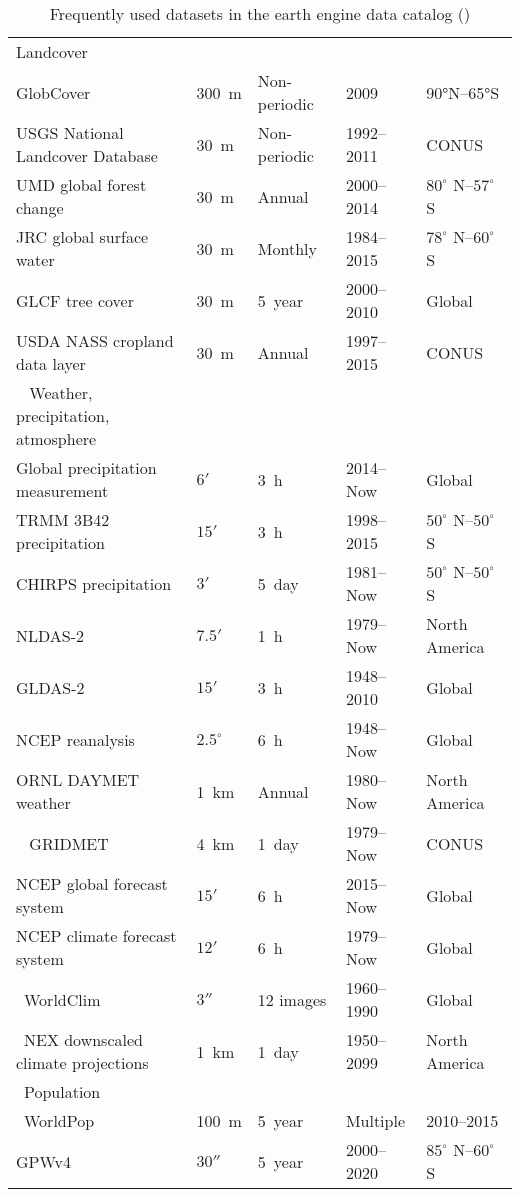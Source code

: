 \begin{table}[h]
\begin{tabularx}{\textwidth}{lXXXX}
		 Landcover		& & & & \\			
		 GlobCover	&300 m	&Non-periodic	&2009&	90°N–65°S\\
		 USGS National Landcover Database&	30 m	&Non-periodic	&1992–2011&	CONUS\\
		 UMD global forest change&	30 m&	Annual	&2000–2014&	$80^\circ$ N–$57^\circ$ S\\
		 JRC global surface water&	30 m&	Monthly	&1984–2015	&$78^\circ$ N–$60^\circ$ S\\
		 GLCF tree cover&	30 m	&5 year	&2000–2010	&Global\\
		 USDA NASS cropland data layer&	30 m&	Annual&	1997–2015&	CONUS\\
		  
		 Weather, precipitation, atmosphere	& & & & \\				
		 Global precipitation measurement& 	$6'$& 	3 h	& 2014–Now& 	Global\\
		 TRMM 3B42 precipitation& 	$15'$& 	3 h	& 1998–2015	& $50^\circ$ N–$50^\circ$ S\\
		 CHIRPS precipitation& 	$3'$& 	5 day& 	1981–Now& 	$50^\circ$ N–$50^\circ$ S\\
		 NLDAS-2& 	$7.5'$& 	1 h	& 1979–Now	& North America\\
		 GLDAS-2& 	$15'$& 	3 h	& 1948–2010	& Global\\
		 NCEP reanalysis& 	$2.5^\circ$ & 	6 h	& 1948–Now& 	Global\\
		 ORNL DAYMET weather& 	1 km& 	Annual& 1980–Now& 	North America\\
		  
		 GRIDMET&	4 km&	1 day&	1979–Now&	CONUS\\
		 NCEP global forecast system&	$15'$&	6 h&	2015–Now&	Global\\
		 NCEP climate forecast system&	$12'$	&6 h&	1979–Now&	Global\\
		 WorldClim	&$3''$ &	12 images&	1960–1990&	Global\\
		 NEX downscaled climate projections&	1 km&	1 day&	1950–2099&	North America\\
		 Population		& & & & \\		
		 WorldPop	&100 m	&5 year	&Multiple	& 2010–2015\\
		 GPWv4	& $30''$ &	5 year&	2000–2020&	$85^\circ$ N–$60^\circ$ S\\
		\bottomrule
	\end{tabularx}
	\caption{Frequently used datasets in the earth engine data catalog (\cite{gorelick2017google})}
	\label{dependencies}
\end{table}
